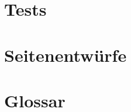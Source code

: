 \documentclass[parskip=full,11pt,twoside]{scrartcl}
\begin{document}
\section{Tests}

%
%
%

\pagebreak
\appendix

\section{Seitenentwürfe}


\section{Glossar}

\glsaddall
\printglossaries
\end{document}

